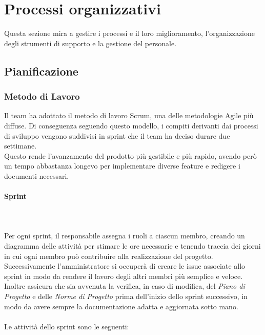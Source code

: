 \section{Processi organizzativi}
Questa sezione mira a gestire i processi e il loro miglioramento,
l'organizzazione degli strumenti di supporto e la gestione del personale.

\subsection{Pianificazione}
\subsubsection{Metodo di Lavoro}
Il team ha adottato il metodo di lavoro Scrum, una delle metodologie Agile più
diffuse. Di conseguenza seguendo questo modello, i compiti derivanti dai
processi di sviluppo vengono suddivisi in sprint che il team ha deciso durare
due settimane.\\ Questo rende l'avanzamento del prodotto più gestibile e più
rapido, avendo però un tempo abbastanza longevo per implementare diverse
feature e redigere i documenti necessari. \paragraph*{Sprint}\label{inf:sprint}
~\\\\ Per ogni sprint, il responsabile assegna i ruoli a ciascun membro,
creando un diagramma delle attività per stimare le ore necessarie e tenendo
traccia dei giorni in cui ogni membro può contribuire alla realizzazione del
progetto. Successivamente l'amministratore si occuperà di creare le issue
associate allo sprint in modo da rendere il lavoro degli altri membri più
semplice e veloce. Inoltre assicura che sia avvenuta la verifica, in caso di
modifica, del \textit{Piano di Progetto} e delle \textit{Norme di Progetto}
prima dell'inizio dello sprint successivo, in modo da avere sempre la
documentazione adatta e aggiornata sotto mano.\\\\ Le attività dello sprint
sono le seguenti:
